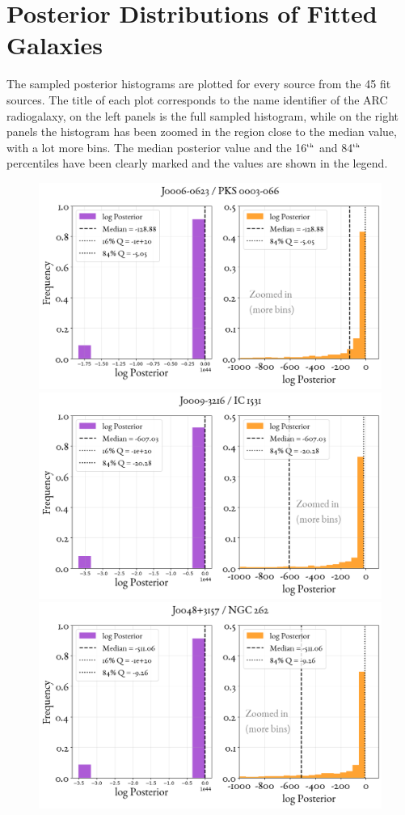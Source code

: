 \clearpage
\chapter{Posterior Distributions of Fitted Galaxies} \label{app:Poster}
The sampled posterior histograms are plotted for every source from the 45 fit sources. The title of each plot corresponds to the name identifier of the ARC radiogalaxy, on the left panels is the full sampled histogram, while on the right panels the histogram has been zoomed in the region close to the median value, with a lot more bins. The median posterior value and the 16$^{\mbox{\tiny{th}}}$ and 84$^{\mbox{\tiny{th}}}$ percentiles have been clearly marked and the values are shown in the legend. 



\begin{figure}
    \centering
    \includegraphics[width=0.8\linewidth]{figures/ResultPosteriors/0_Posterior_10.png}\\
    \includegraphics[width=0.8\linewidth]{figures/ResultPosteriors/1_Posterior_16.png}\\
    \includegraphics[width=0.8\linewidth]{figures/ResultPosteriors/2_Posterior_103.png}    
\end{figure}


